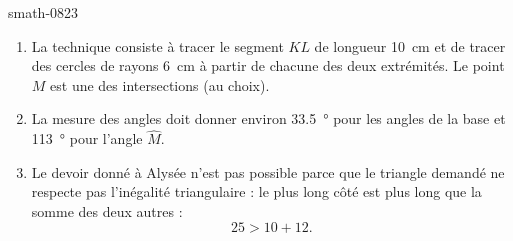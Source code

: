 
\begin{corrige}{smath-0823}

    \begin{enumerate}
        \item
            La technique consiste à tracer le segment \( KL\) de longueur \SI{10}{\centi\meter} et de tracer des cercles de rayons \SI{6}{\centi\meter} à partir de chacune des deux extrémités. Le point \( M\) est une des intersections (au choix).

\begin{center}
   
\end{center}

        \item
            La mesure des angles doit donner environ \SI{33.5}{\degree} pour les angles de la base et \SI{113}{\degree} pour l'angle \( \hat M\).

        \item
            Le devoir donné à Alysée n'est pas possible parce que le triangle demandé ne respecte pas l'inégalité triangulaire : le plus long côté est plus long que la somme des deux autres :
            \begin{equation}
                25>10+12.
            \end{equation}
    \end{enumerate}

\end{corrige}
